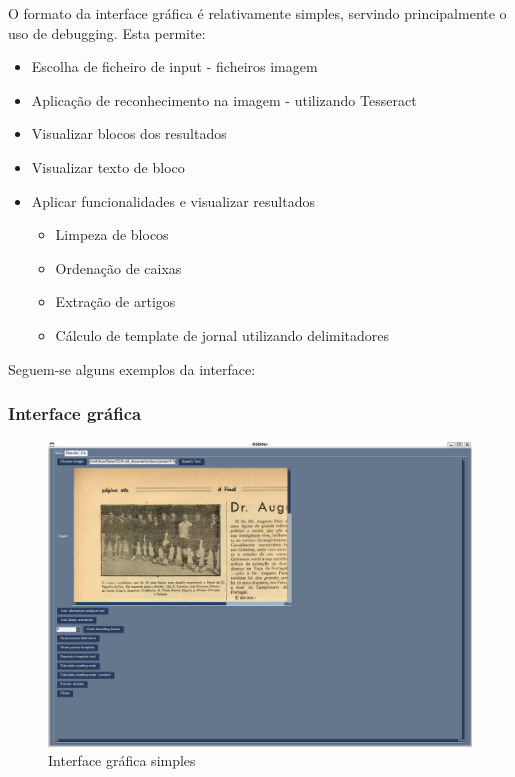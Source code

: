 O formato da interface gráfica é relativamente simples, servindo principalmente o uso de debugging. Esta permite:

\begin{itemize}\setlength\itemsep{0.05cm}
    \item Escolha de ficheiro de input - ficheiros imagem
    \item Aplicação de reconhecimento na imagem - utilizando Tesseract
    \item Visualizar blocos dos resultados
    \item Visualizar texto de bloco
    \item Aplicar funcionalidades e visualizar resultados
    \begin{itemize}
        \item Limpeza de blocos
        \item Ordenação de caixas
        \item Extração de artigos
        \item Cálculo de template de jornal utilizando delimitadores
    \end{itemize}
\end{itemize}

Seguem-se alguns exemplos da interface:

\subsubsection{Interface gráfica}

\begin{figure}[H]
    \centering
    \includegraphics[width=1\textwidth]{images/implementacao/gui/gui_base.png}
    \caption{Interface gráfica simples}
    \label{fig:gui_base}
\end{figure}

